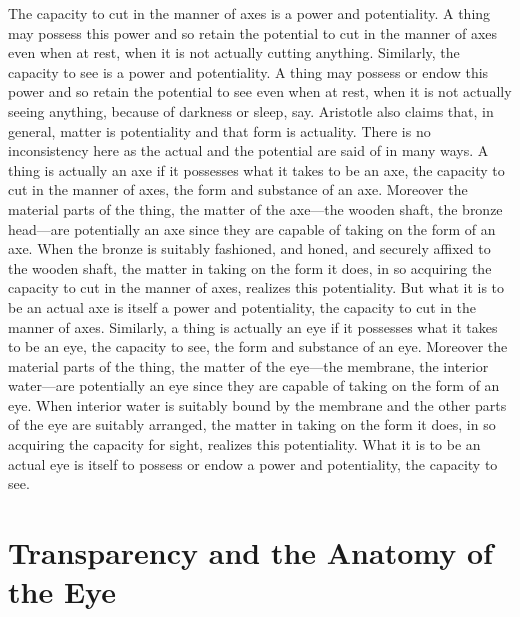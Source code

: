 The capacity to cut in the manner of axes is a power and potentiality. A thing may possess this power and so retain the potential to cut in the manner of axes even when at rest, when it is not actually cutting anything. Similarly, the capacity to see is a power and potentiality. A thing may possess or endow this power and so retain the potential to see even when at rest, when it is not actually seeing anything, because of darkness or sleep, say. Aristotle also claims that, in general, matter is potentiality and that form is actuality. There is no inconsistency here as the actual and the potential are said of in many ways. A thing is actually an axe if it possesses what it takes to be an axe, the capacity to cut in the manner of axes, the form and substance of an axe. Moreover the material parts of the thing, the matter of the axe---the wooden shaft, the bronze head---are potentially an axe since they are capable of taking on the form of an axe. When the bronze is suitably fashioned, and honed, and securely affixed to the wooden shaft, the matter in taking on the form it does, in so acquiring the capacity to cut in the manner of axes, realizes this potentiality. But what it is to be an actual axe is itself a power and potentiality, the capacity to cut in the manner of axes. Similarly, a thing is actually an eye if it possesses what it takes to be an eye, the capacity to see, the form and substance of an eye. Moreover the material parts of the thing, the matter of the eye---the membrane, the interior water---are potentially an eye since they are capable of taking on the form of an eye. When interior water is suitably bound by the membrane and the other parts of the eye are suitably arranged, the matter in taking on the form it does, in so acquiring the capacity for sight, realizes this potentiality. What it is to be an actual eye is itself to possess or endow a power and potentiality, the capacity to see.


\section{Transparency and the Anatomy of the Eye} %
\label{sec:transparency_and_the_anatomy_of_the_eye}


